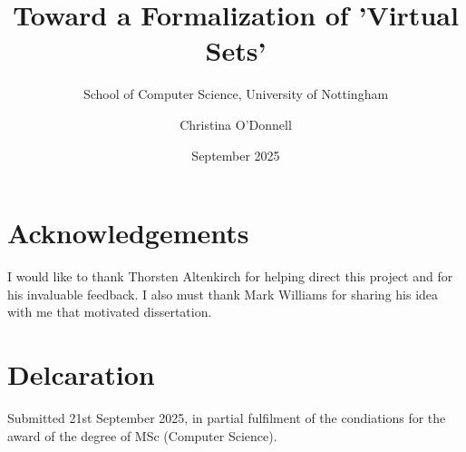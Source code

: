 \documentclass[4pt,a4paper]{report}
\title{Toward a Formalization of 'Virtual Sets'}
\author{Christina O'Donnell}
\subtitle{School of Computer Science, University of Nottingham}
\date{September 2025}
\begin{document}
\maketitle

\section*{Acknowledgements}
I would like to thank Thorsten Altenkirch
for helping direct this project and for his invaluable feedback. I
also must thank Mark Williams for sharing his idea with me that
motivated dissertation.

\section*{Delcaration}
Submitted 21st September 2025, in partial fulfilment of the condiations for the award of the degree of MSc (Computer Science).
\end{document}
